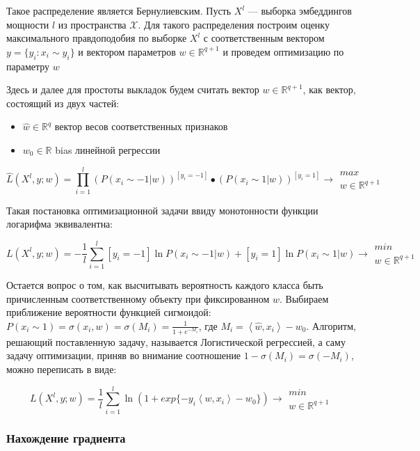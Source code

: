 \documentclass{article}
\begin{document}
    \noindent Такое распределение является Бернулиевским. Пусть $X^l$ — выборка эмбеддингов мощности $l$ из пространства $\mathcal{X}$. Для такого распределения построим оценку максимального правдоподобия по выборке $X^{l}$ с соответственным вектором $y = \{y_i: x_i \sim y_i\}$ и вектором параметров $w \in \mathds{R}^{q + 1}$ и проведем оптимизацию по параметру $w$

    \begin{leftrule}
        Здесь и далее для простоты выкладок будем считать вектор $w \in \mathds{R}^{q + 1}$, как вектор, состоящий из двух частей:
            \begin{itemize}
                \item $\hat{w} \in \mathds{R}^q$ вектор весов соответственных признаков
                \item $w_0 \in \mathds{R}$ bias линейной регрессии
            \end{itemize}
    \end{leftrule}

    $$\hat{L}(X^l, y; w) = \prod_{i=1}^{l}{(P(x_i \sim -1 | w))^{[y_i = -1]} • (P(x_i \sim 1 | w))^{[y_i = 1]}} \longrightarrow \substack{max \\ w \in \mathds{R}^{q + 1}}$$

    Такая постановка оптимизационной задачи ввиду монотонности функции логарифма эквивалентна:
    
    $$L(X^l, y; w) = -\frac{1}{l}\sum_{i=1}^{l}{[y_i = -1]\ln{P(x_i \sim -1 | w)} + [y_i = 1]\ln{P(x_i \sim 1 | w)}} \longrightarrow \substack{min \\ w \in \mathds{R}^{q + 1}}$$


    Остается вопрос о том, как высчитывать вероятность каждого класса быть причисленным соответственному объекту при фиксированном $w$. Выбираем приближение вероятности функцией сигмоидой: $P(x_i \sim 1) = \sigma(x_i, w) = \sigma(M_i) = \frac{1}{1 + e^{-M_i}}$, где $M_i=\left\langle \hat{w}, x_i\right\rangle - w_0$. Алгоритм, решающий поставленную задачу, называется Логистической регрессией, а саму задачу оптимизации, приняв во внимание соотношение $1 - \sigma(M_i) = \sigma(-M_i)$, можно переписать в виде: 

    $$L(X^l, y; w) = \frac{1}{l}\sum_{i=1}^{l}{\ln(1+exp\{-y_i\left\langle w, x_i \right\rangle - w_0\})} \longrightarrow \substack{min \\ w \in \mathds{R}^{q + 1}}$$

    \subsubsection{Нахождение градиента}
        
\end{document}
